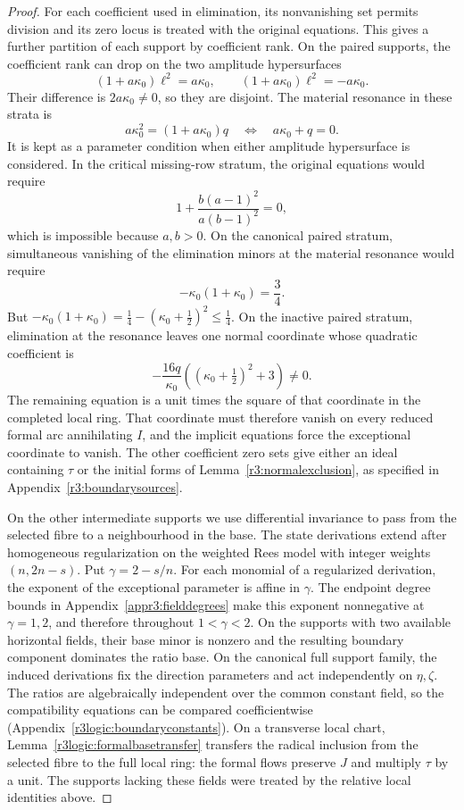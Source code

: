 \documentclass[11pt,a4paper]{article}
\numberwithin{equation}{section}
\theoremstyle{plain}
\theoremstyle{definition}
\theoremstyle{remark}
\begin{document}
\begin{proof}
For each coefficient used in elimination, its nonvanishing set permits
division and its zero locus is treated with the original equations.
This gives a further partition of each support by coefficient rank.
On the paired supports, the coefficient rank can drop on the
two amplitude hypersurfaces
\[
 (1+a\kappa_0)\ell^2=a\kappa_0,
 \qquad (1+a\kappa_0)\ell^2=-a\kappa_0.
\]
Their difference is $2a\kappa_0\ne0$, so they are disjoint.
The material resonance in these strata is
\[
 a\kappa_0^2=(1+a\kappa_0)q
 \quad\Longleftrightarrow\quad a\kappa_0+q=0.
\]
It is kept as a parameter condition when either amplitude
hypersurface is considered. In the critical missing-row stratum,
the original equations would require
\[
 1+\frac{b(a-1)^2}{a(b-1)^2}=0,
\]
which is impossible because $a,b>0$. On the canonical paired
stratum, simultaneous vanishing of the elimination minors at
the material resonance would require
\[
 -\kappa_0(1+\kappa_0)=\frac34.
\]
But $-\kappa_0(1+\kappa_0)=\frac14-(\kappa_0+\frac12)^2\le\frac14$.
On the inactive paired stratum, elimination at the resonance leaves
one normal coordinate whose quadratic coefficient is
\[
 -\frac{16q}{\kappa_0}
       \left((\kappa_0+\tfrac12)^2+3\right)\ne0.
\]
The remaining equation is a unit times the square of that coordinate
in the completed local ring. That coordinate must therefore vanish on
every reduced formal arc annihilating $I$, and the implicit equations force the exceptional coordinate
to vanish. The other coefficient zero sets give either an ideal
containing $\tau$ or the initial forms of
Lemma~\ref{r3:normalexclusion}, as specified in
Appendix~\ref{r3:boundarysources}.

On the other intermediate supports we use differential invariance
to pass from the selected fibre to a neighbourhood in the base.
The state derivations extend after homogeneous regularization on
the weighted Rees model with integer weights $(n,2n-s)$. Put
$\gamma=2-s/n$. For each monomial of a regularized derivation, the
exponent of the exceptional parameter is affine in $\gamma$.
The endpoint degree bounds in Appendix~\ref{appr3:fielddegrees}
make this exponent nonnegative at $\gamma=1,2$, and therefore
throughout $1<\gamma<2$.
On the supports with two available horizontal fields, their base
minor is nonzero and the resulting boundary component dominates
the ratio base. On the canonical full support family, the induced
derivations fix the direction parameters and act independently on
$\eta,\zeta$. The ratios are algebraically independent over the
common constant field, so the compatibility equations can be compared
coefficientwise (Appendix~\ref{r3logic:boundaryconstants}).
On a transverse local chart, Lemma~\ref{r3logic:formalbasetransfer}
transfers the radical inclusion from the selected fibre to the full
local ring: the formal flows preserve $J$ and multiply $\tau$ by
a unit. The supports lacking these fields were treated by the
relative local identities above.


\end{proof}
\end{document}
